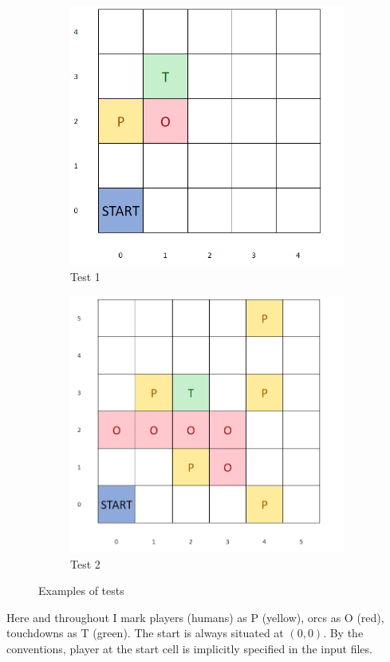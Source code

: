 \documentclass{article}
\begin{document}
\begin{figure}[ht]
   	 \centering
     \begin{subfigure}[b]{0.45\textwidth}
         \centering
         \includegraphics[width=\textwidth]{images/image1.png}
         \caption{Test 1}
         \label{fig:test1}
     \end{subfigure}
     \hfill
     \begin{subfigure}[b]{0.45\textwidth}
         \centering
         \includegraphics[width=\textwidth]{images/image2.png}
         \caption{Test 2}
         \label{fig:test2}
     \end{subfigure}
     \caption{Examples of tests}
\end{figure}
Here and throughout I mark players (humans) as P (yellow), orcs as O (red), touchdowns as T (green). The start is always situated at $(0, 0)$. By the conventions, player at the start cell is implicitly specified in the input files.
\end{document}
